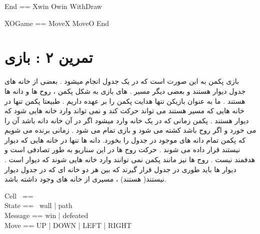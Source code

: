 \documentclass{article}
\begin{document}
\begin{zed}
End == Xwin \lor Owin \lor WithDraw
\end{zed}

\begin{zed}
XOGame == MoveX \lor MoveO \lor End
\end{zed}

\section*{تمرین ۲ : بازی }
بازی پکمن به این صورت است که در یک جدول انجام میشود . بعضی از خانه های جدول دیوار  هستند و بعضی دیگر مسیر .  های بازی به شکل پکمن ، روح ها و دانه ها هستند . ما به عنوان بازیکن تنها هدایت پکمن را بر عهده داریم . طبیعتا پکمن تنها در خانه هایی که مسیر هستند می تواند حرکت کند و نمی تواند وارد خانه هایی شود که دیوار هستند . پکمن زمانی که در یک خانه وارد میشود اگر در آن خانه دانه باشد آن را می خورد و اگر روح باشد کشته می شود و بازی تمام می شود . زمانی برنده می شویم که پکمن تمام دانه های موجود در جدول را بخورد. دانه ها تنها در خانه هایی که دیوار نیستند قرار داده می شوند . حرکت روح ها در این سناریو به طور تصادفی است و هدفمند نیست . روح ها نیز مانند پکمن نمی توانند وارد خانه هایی شوند که دیوار است . دیوار ها باید طوری در جدول قرار گیرند که بین هر دو خانه ای که در جدول دیوار نیستند( هستند) ، مسیری از خانه های  وجود داشته باشد.
\\ 
\begin{zed}
Cell~ == ~\nat \cross \nat\\
State == ~wall | path\\
Message == win | defeated\\
Move == UP | DOWN | LEFT | RIGHT
\end{zed}
\end{document}
